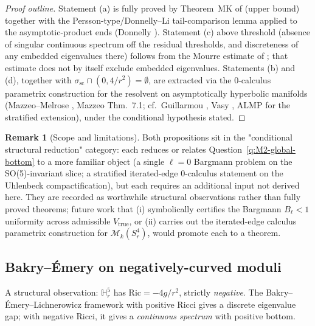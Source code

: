 \documentclass[11pt,letterpaper]{article}
\theoremstyle{definition}
\newtheorem{remark}[theorem]{Remark}
\newcommand{\bbH}{\mathbb{H}}
\newcommand{\cM}{\mathcal{M}}
\newcommand{\Ric}{\mathrm{Ric}}
\begin{document}
\begin{proof}[Proof outline]
Statement (a) is fully proved by Theorem~MK of \cite{bonfioli-core} (upper bound) together with the Persson-type/Donnelly--Li tail-comparison lemma applied to the asymptotic-product ends (Donnelly \cite{Donnelly1981}). Statement (c) above threshold (absence of singular continuous spectrum off the residual thresholds, and discreteness of any embedded eigenvalues there) follows from the Mourre estimate of \cite{bonfioli-core}; that estimate does not by itself exclude embedded eigenvalues. Statements (b) and (d), together with $\sigma_{\mathrm{sc}}\cap(0, 4/r^2) = \emptyset$, are extracted via the $0$-calculus parametrix construction for the resolvent on asymptotically hyperbolic manifolds (Mazzeo--Melrose \cite{MazzeoMelrose1987}, Mazzeo \cite{Mazzeo1991} Thm.~7.1; cf.\ Guillarmou \cite{Guillarmou2005}, Vasy \cite{Vasy2013}, ALMP \cite{ALMP2012} for the stratified extension), under the conditional hypothesis stated.
\end{proof}

\begin{remark}[Scope and limitations]
Both propositions sit in the "conditional structural reduction" category: each reduces or relates Question~\ref{q:M2-global-bottom} to a more familiar object (a single $\ell=0$ Bargmann problem on the SO(5)-invariant slice; a stratified iterated-edge $0$-calculus statement on the Uhlenbeck compactification), but each requires an additional input not derived here. They are recorded as worthwhile structural observations rather than fully proved theorems; future work that (i) symbolically certifies the Bargmann $B_\ell < 1$ uniformity across admissible $V_{\mathrm{true}}$, or (ii) carries out the iterated-edge calculus parametrix construction for $\cM_k(S^4_r)$, would promote each to a theorem.
\end{remark}

\subsection{Bakry--\'Emery on negatively-curved moduli}\label{sec:BE-negative}

A structural observation: $\bbH^5_r$ has $\Ric = -4g/r^2$, strictly \emph{negative}. The Bakry--\'Emery--Lichnerowicz framework with positive Ricci gives a discrete eigenvalue gap; with negative Ricci, it gives a \emph{continuous spectrum} with positive bottom.
\end{document}

